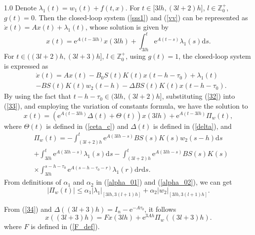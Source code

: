 \documentclass[journal]{IEEEtran}
\begin{document}
\begin{spacing}{1.0}
Denote $\lambda_{1}(t)=w_{1}(t)+f(t,x)$. For $t\in\lbrack3lh,(3l+2)h]$, $l\in%
\mathbb{Z}
_{0}^{+}$, $g(t)=0$. Then the closed-loop system (\ref{sss1}) and (\ref{vv})
can be represented as
$\dot{x}(t)=Ax(t)+\lambda_{1}(t)$,
whose solution is
given by
\begin{equation}
x(t)=\mathrm{e}^{A(t-3lh)}x(3lh)+\int_{3lh}^{t}\mathrm{e}^{A\left(
t-s\right)  }\lambda_{1}(s)\mathrm{d}s. \label{32}%
\end{equation}
For $t\in((3l+2)h,(3l+3)h]$, $l\in%
\mathbb{Z}
_{0}^{+}$, using $g(t)=1$, the closed-loop system is expressed as
\begin{align}
&\dot{x}(t)=  Ax(t)-B_{0}S(t)K(
t)  x(t-h-\tau_{0})+\lambda_{1}(t) \nonumber\\
&  -BS(t)K(t) w_{2}(t-h)-\mathit{\Delta}BS(t)K(t)
x(t-h-\tau_{0})  . \label{33}%
\end{align}
By using the fact that $t-h-\tau_{0}\in(3lh,(3l+2)h]$, substituting (\ref{32})
into (\ref{33}), and employing the variation of constants formula, we have the
solution to
\begin{equation}
x\left(  t\right)  =\left(  \mathrm{e}^{A\left(  t-3lh\right)  }%
\mathit{\Delta}(t)+\mathit{\Theta}(t)\right)  x\left(  3lh\right)
+\mathrm{e}^{A\left(  t-3lh\right)  }\mathit{\Pi}_{w}\left(  t\right)  ,
\label{34}%
\end{equation}
where $\mathit{\Theta}(t)$ is defined in (\ref{ceta_c}) and $\mathit{\Delta
}(t)$ is defined in (\ref{delta}), and
\begin{align*}
&\mathit{\Pi}_{w}(t)=  -\int_{(3l+2)h}^{t}\mathrm{e}^{A(3lh-s)}BS(s)K\left(  s\right)w_{2}(s-h)\mathrm{d}s\\
&  +\int_{3lh}^{t}\mathrm{e}^{A(3lh-s)}\lambda_{1}(s)\mathrm{d}s -\int_{(3l+2)h}^{t}\mathrm{e}^{A(3lh-s)}BS(s)K\left(  s\right) \\
&  \times\int_{3lh}^{s-h-\tau_{0}}\mathrm{e}^{A(s-h-\tau_{0}-r)}\lambda
_{1}(r)\mathrm{d}r\mathrm{d}s.
\end{align*}
From definitions of $\alpha_{1}$ and $\alpha_{2}$ in (\ref{alpha_01}) and
(\ref{alpha_02}), we can get
\[
\left|\mathit{\Pi}_{w}(t)\right|
\leq
\alpha_{1}\left|\lambda_{1}\right|_{[3lh,3(l+1)h]}
+
\alpha_{2}\left|w_{2}\right|_{[3lh,3(l+1)h]}.
\]


From (\ref{34}) and $\mathit{\Delta}((3l+3)h)=I_{n}-\mathrm{e}^{-A\tau_{0}}$,
it follows
\begin{equation}
x\left( (3l+3)h\right)  =Fx\left(  3lh\right)  +\mathrm{e}^{3Ah}\mathit{\Pi
}_{w}\left(  (3l+3)h\right)  . \label{35}%
\end{equation}
where $F$ is defined in (\ref{F_def}).


\end{spacing}
\end{document}
